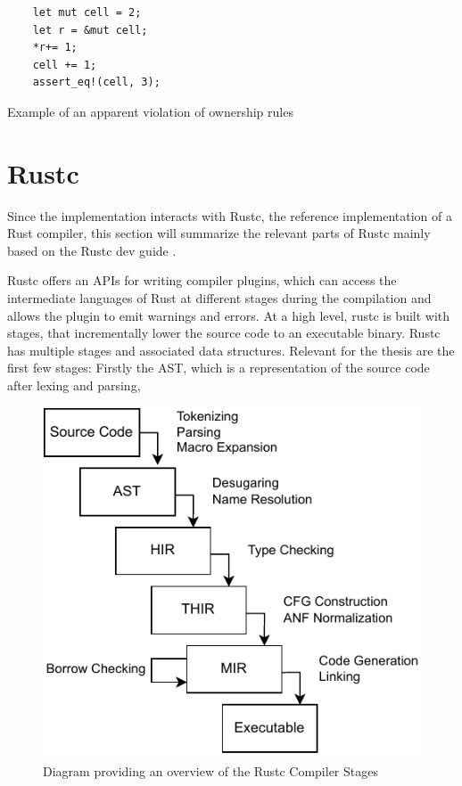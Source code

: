 \documentclass[twoside, english]{sdqthesis}
\theoremstyle{definition}
\begin{document}
\begin{listing}[ht]
  \begin{verbatim}
    let mut cell = 2;
    let r = &mut cell;
    *r+= 1;
    cell += 1;
    assert_eq!(cell, 3);
  \end{verbatim}
  \caption{Example of an apparent violation of ownership rules}
  \label{lst:alias-mut}
\end{listing}

\section{Rustc}

Since the implementation interacts with Rustc, the reference implementation of a Rust compiler, this section will summarize the relevant parts of Rustc mainly based on the Rustc dev guide \cite{noauthor_overview_nodate}.

Rustc offers an APIs for writing compiler plugins, which can access the intermediate languages of Rust at different stages during the compilation and allows the plugin to emit warnings and errors. 
At a high level, rustc is built with stages, that incrementally lower the source code to an executable binary. Rustc has multiple stages and associated data structures. 
Relevant for the thesis are the first few stages: Firstly the AST, which is a representation of the source code after lexing and parsing, 

\begin{figure}[h]
	\centering
	\includegraphics[width=0.7\linewidth]{./rustc-stages.pdf}
	\caption{Diagram providing an overview of the Rustc Compiler Stages}
	\label{fig:rust-stages}
\end{figure}
\end{document}
